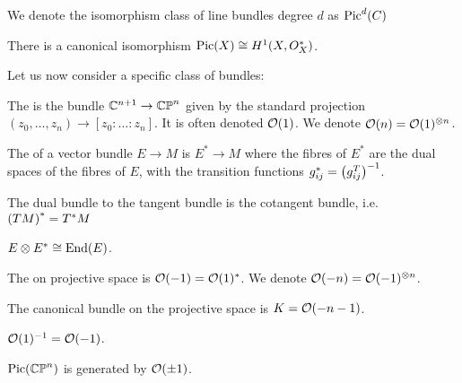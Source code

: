 \documentclass{article}
\begin{document}
\begin{notation}
    We denote the isomorphism class of line bundles degree $d$ as $\operatorname{Pic}^d(C)$
\end{notation}

\begin{prop}
	There is a canonical isomorphism $\operatorname{Pic}(X) \cong H^1(X, O_X^\ast)$. 
\end{prop}

Let us now consider a specific class of bundles: 

\begin{definition}
	The  is the bundle $\mathbb{C}^{n+1} \to \mathbb{CP}^n$ given by the standard projection $(z_0, \dots, z_n) \to [z_0: \dots : z_n]$. It is often denoted $\mathcal{O}(1)$.  We denote $\mathcal{O}(n) = \mathcal{O}(1)^{\otimes n}$.
\end{definition}

\begin{definition}
	The  of a vector bundle $E \to M$ is $E^\ast \to M$ where the fibres of $E^\ast$ are the dual spaces of the fibres of $E$, with the transition functions $g_{ij}^\ast = \left( g_{ij}^T \right)^{-1}$.
\end{definition}

\begin{example}
	The dual bundle to the tangent bundle is the cotangent bundle, i.e. $\left( TM \right)^\ast = T^\ast M$
\end{example}

\begin{lemma}
	$E \otimes E^\ast \cong \operatorname{End}(E)$. 
\end{lemma}

\begin{definition}
	The  on projective space is $\mathcal{O}(-1) = \mathcal{O}(1)^\ast$. We denote $\mathcal{O}(-n) = \mathcal{O}(-1)^{\otimes n}$. 
\end{definition}

\begin{prop}
	The canonical bundle on the projective space is $K = \mathcal{O}(-n-1)$. 
\end{prop}

\begin{lemma}
	$\mathcal{O}(1)^{-1} = \mathcal{O}(-1)$. 
\end{lemma}
\begin{corollary}
	$\operatorname{Pic}(\mathbb{CP}^n)$ is generated by $\mathcal{O}(\pm1)$.  
\end{corollary}
\end{document}
